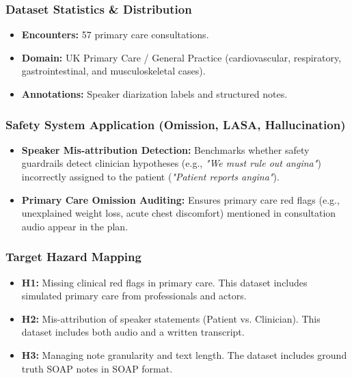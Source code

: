 \documentclass[11pt,a4paper]{article}
\begin{document}
\subsubsection*{Dataset Statistics \& Distribution}
\begin{itemize}
    \item \textbf{Encounters:} 57 primary care consultations.
    \item \textbf{Domain:} UK Primary Care / General Practice (cardiovascular, respiratory, gastrointestinal, and musculoskeletal cases).
    \item \textbf{Annotations:} Speaker diarization labels and structured notes.
\end{itemize}

\subsubsection*{Safety System Application (Omission, LASA, Hallucination)}
\begin{itemize}
    \item \textbf{Speaker Mis-attribution Detection:} Benchmarks whether safety guardrails detect clinician hypotheses (e.g., \textit{"We must rule out angina"}) incorrectly assigned to the patient (\textit{"Patient reports angina"}).
    \item \textbf{Primary Care Omission Auditing:} Ensures primary care red flags (e.g., unexplained weight loss, acute chest discomfort) mentioned in consultation audio appear in the plan.
\end{itemize}

\subsubsection*{Target Hazard Mapping }
\begin{itemize}
    \item \textbf{H1:} Missing clinical red flags in primary care. This dataset includes simulated primary care from professionals and actors.
    \item \textbf{H2:} Mis-attribution of speaker statements (Patient vs. Clinician). This dataset includes both audio and a written transcript.
    \item \textbf{H3:} Managing note granularity and text length. The dataset includes ground truth SOAP notes in SOAP format.

\end{itemize}
\end{document}
